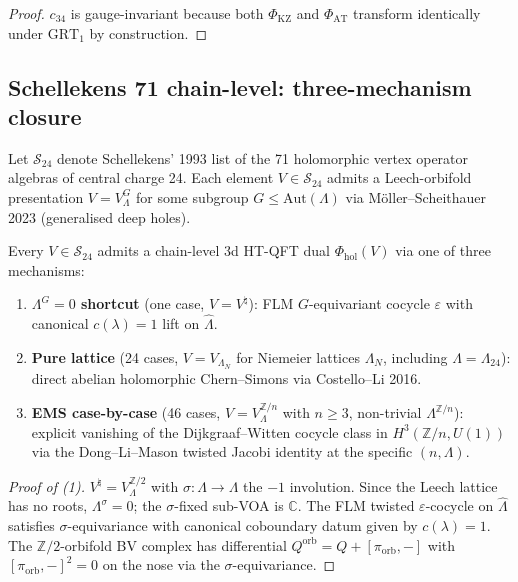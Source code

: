 \documentclass[11pt]{article}
\begin{document}
\begin{proof}
$c_{34}$ is gauge-invariant because both $\Phi_{\mathrm{KZ}}$ and
$\Phi_{\mathrm{AT}}$ transform identically under $\mathrm{GRT}_1$
by construction.
\end{proof}

\subsection{Schellekens 71 chain-level: three-mechanism closure}
\label{subsec:schellekens-three-mechanism}

Let $\mathcal{S}_{24}$ denote Schellekens' 1993 list of the 71 holomorphic
vertex operator algebras of central charge 24. Each element $V \in
\mathcal{S}_{24}$ admits a Leech-orbifold presentation $V = V_{\Lambda}^G$ for
some subgroup $G \leq \mathrm{Aut}(\Lambda)$ via M\"oller--Scheithauer
2023 (generalised deep holes).

\begin{theorem}
\label{thm:schellekens-chain-level}
Every $V \in \mathcal{S}_{24}$ admits a chain-level $3$d HT-QFT dual
$\Phi_{\mathrm{hol}}(V)$ via one of three mechanisms:
\begin{enumerate}
\item \textbf{$\Lambda^G = 0$ shortcut} (one case, $V = V^{\natural}$):
FLM $G$-equivariant cocycle $\varepsilon$ with canonical
$c(\lambda) = 1$ lift on $\widehat{\Lambda}$.
\item \textbf{Pure lattice} (24 cases, $V = V_{\Lambda_N}$ for Niemeier
lattices $\Lambda_N$, including $\Lambda = \Lambda_{24}$): direct
abelian holomorphic Chern--Simons via Costello--Li 2016.
\item \textbf{EMS case-by-case} (46 cases, $V = V_{\Lambda}^{\mathbb{Z}/n}$ with
$n \ge 3$, non-trivial $\Lambda^{\mathbb{Z}/n}$): explicit vanishing of
the Dijkgraaf--Witten cocycle class in $H^3(\mathbb{Z}/n, U(1))$ via the
Dong--Li--Mason twisted Jacobi identity at the specific $(n, \Lambda)$.
\end{enumerate}
\end{theorem}

\begin{proof}[Proof of (1)]
$V^{\natural} = V_{\Lambda}^{\mathbb{Z}/2}$ with
$\sigma : \Lambda \to \Lambda$ the $-1$ involution. Since the Leech
lattice has no roots, $\Lambda^{\sigma} = 0$; the $\sigma$-fixed
sub-VOA is $\mathbb{C}$. The FLM twisted $\varepsilon$-cocycle on
$\widehat{\Lambda}$ satisfies $\sigma$-equivariance with canonical
coboundary datum given by $c(\lambda) = 1$. The $\mathbb{Z}/2$-orbifold
BV complex has differential $Q^{\mathrm{orb}} = Q + [\pi_{\mathrm{orb}}, -]$
with $[\pi_{\mathrm{orb}}, -]^2 = 0$ on the nose via the
$\sigma$-equivariance.
\end{proof}
\end{document}
